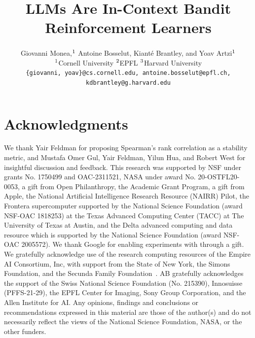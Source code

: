 \documentclass{article} %
\title{LLMs Are In-Context Bandit Reinforcement Learners}
\author{Giovanni Monea,$^1$ Antoine Bosselut,\textsuperscript{\epflid} Kianté Brantley,\textsuperscript{\harvardid} and Yoav Artzi$^1$ \\
$^1$Cornell University \hspace{2em} $^2$EPFL \hspace{2em} $^3$Harvard University\\
\texttt{\{giovanni, yoav\}@cs.cornell.edu, antoine.bosselut@epfl.ch,}\\
\texttt{kdbrantley@g.harvard.edu}
}
\begin{document}
\ifcolmsubmission
\linenumbers
\fi

\maketitle

\begin{abstract}

\end{abstract}

















\section*{{Acknowledgments}}
We thank Yair Feldman for proposing Spearman's rank correlation as a stability metric, and Mustafa Omer Gul, Yair Feldman, Yilun Hua, and Robert West for insightful discussion and feedback. 
This research was supported by NSF under grants No. 1750499 and OAC-2311521, NASA under award No. 20-OSTFL20-0053, a gift from Open Philanthropy, the Academic Grant Program, a gift from Apple, the National Artificial Intelligence Research Resource (NAIRR) Pilot, the Frontera supercomputer supported by the National Science Foundation (award NSF-OAC 1818253) at the Texas Advanced Computing Center (TACC) at The University of Texas at Austin, and the Delta advanced computing and data resource which is supported by the National Science Foundation (award NSF-OAC 2005572). We thank Google for enabling experiments with \gemini through a gift.
We gratefully acknowledge use of the research computing resources of the Empire AI Consortium, Inc, with support from the State of New York, the Simons Foundation, and the Secunda Family Foundation~\citep{Bloom2025EmpireAI}.
AB gratefully acknowledges the support of the Swiss National Science Foundation (No. 215390), Innosuisse (PFFS-21-29), the EPFL Center for Imaging, Sony Group Corporation, and the Allen Institute for AI.
Any opinions, findings and conclusions or recommendations expressed in this material are those of the author(s) and do not necessarily reflect the views of the National Science Foundation, NASA, or the other funders. 






\newpage

\onecolumn

\appendix



\end{document}
